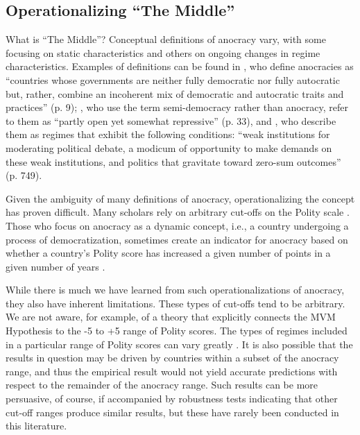 \documentclass[titlepage, onecolumn,12pt]{article}
\begin{document}
\subsection{Operationalizing ``The Middle''}

What is ``The Middle''?  Conceptual definitions of anocracy vary, with some focusing on static characteristics and others on ongoing changes in regime characteristics. Examples of definitions can be found in \citet{marshall2011global}, who define anocracies as ``countries whose governments are neither fully democratic nor fully autocratic but, rather, combine an incoherent mix of democratic and autocratic traits and practices'' (p. 9); \citet{hegre2001toward}, who use the term semi-democracy rather than anocracy, refer to them as ``partly open yet somewhat repressive'' (p. 33), and \citet{regan2009changing}, who describe them as regimes that exhibit the following conditions: ``weak institutions for moderating political debate, a modicum of opportunity to make demands on these weak institutions, and politics that gravitate toward zero-sum outcomes'' (p. 749).

Given the ambiguity of many definitions of anocracy, operationalizing the concept has proven difficult. Many scholars rely on arbitrary cut-offs on the Polity scale \citep{ward1998democratizing,fearon2003ethnicity}. Those who focus on anocracy as a dynamic concept, i.e., a country undergoing a process of democratization, sometimes create an indicator for anocracy based on whether a country's Polity score has increased a given number of points in a given number of years \citep{mansfield2002democratic,savun2011foreign}.

While there is much we have learned from such operationalizations of anocracy, they also have inherent limitations. These types of cut-offs tend to be arbitrary. We are not aware, for example, of a theory that explicitly connects the MVM Hypothesis to the -5 to +5 range of Polity scores. The types of regimes included in a particular range of Polity scores can vary greatly \citep{ward1998democratizing}. It is also possible that the results in question may be driven by countries within a subset of the anocracy range, and thus the empirical result would not yield accurate predictions with respect to the remainder of the anocracy range.  Such results can be more persuasive, of course, if accompanied by robustness tests indicating that other cut-off ranges produce similar results, but these have rarely been conducted in this literature.
\end{document}
